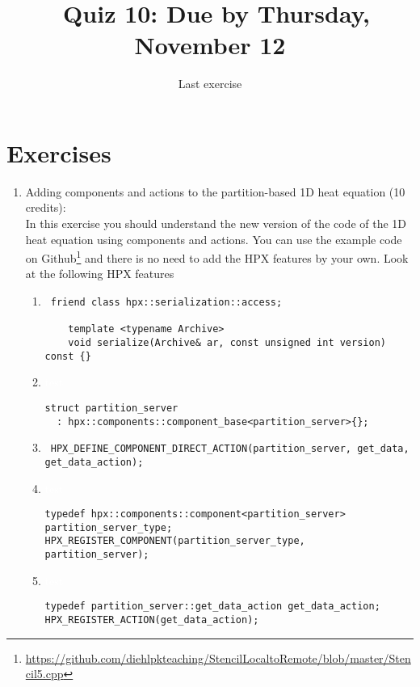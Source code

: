 \documentclass[11pt]{article}
\begin{document}
\title{\coursename~Quiz 10: Due by Thursday, November 12}
\date{Last exercise}
\maketitle

\medskip


\section*{Exercises}

\begin{enumerate}
\item Adding components and actions to the partition-based 1D heat equation (10 credits): \\
In this exercise you should understand the new version of the code of the 1D heat equation using components and actions. You can use the example code on Github\footnote{\url{https://github.com/diehlpkteaching/StencilLocaltoRemote/blob/master/Stencil5.cpp}} and there is no need to add the HPX features by your own. Look at the following HPX features
\begin{enumerate}
\item \begin{lstlisting}
 friend class hpx::serialization::access;

    template <typename Archive>
    void serialize(Archive& ar, const unsigned int version) const {}
\end{lstlisting} 
\item \textcolor{white}{test}

\begin{lstlisting}
struct partition_server
  : hpx::components::component_base<partition_server>{};
\end{lstlisting}

\item \lstinline| HPX_DEFINE_COMPONENT_DIRECT_ACTION(partition_server, get_data, get_data_action);|

\item \textcolor{white}{test}
\begin{lstlisting}
typedef hpx::components::component<partition_server> partition_server_type;
HPX_REGISTER_COMPONENT(partition_server_type, partition_server);
\end{lstlisting}

\item \textcolor{white}{test} 
\begin{lstlisting}
typedef partition_server::get_data_action get_data_action;
HPX_REGISTER_ACTION(get_data_action);
\end{lstlisting}


\end{enumerate}
\end{enumerate}
\end{document}
